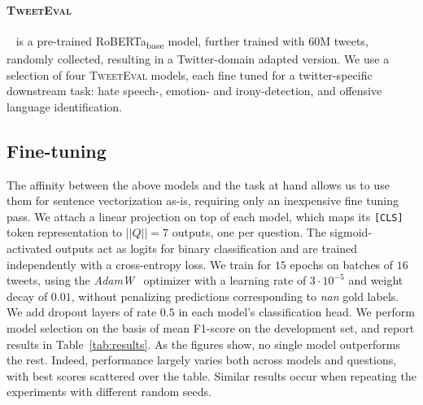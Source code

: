 \documentclass[11pt,a4paper]{article}
\begin{document}
\paragraph{\textsc{TweetEval}}~\cite{cardiff} is a pre-trained RoBERTa\textsubscript{base} model, further trained with 60M tweets, randomly collected, resulting in a Twitter-domain adapted version. 
We use a selection of four \textsc{TweetEval} models, each fine tuned for a twitter-specific downstream task: hate speech-, emotion- and irony-detection, and offensive language identification.


\subsection{Fine-tuning}
The affinity between the above models and the task at hand allows us to use them for sentence vectorization as-is, requiring only an inexpensive fine tuning pass.
We attach a linear projection on top of each model, which maps its \texttt{[CLS]} token representation to $||Q|| = 7$ outputs, one per question.
The sigmoid-activated outputs act as logits for binary classification and are trained independently with a cross-entropy loss.
We train for $15$ epochs on batches of $16$ tweets, using the \textit{AdamW}~\cite{adamw} optimizer with a learning rate of $3\cdot 10^{-5}$ and weight decay of $0.01$, without penalizing predictions corresponding to \textit{nan} gold labels.
We add dropout layers of rate $0.5$ in each model's classification head.
We perform model selection on the basis of mean F1-score on the development set, and report results in Table~\ref{tab:results}.
As the figures show, no single model outperforms the rest.
Indeed, performance largely varies both across models and questions, with best scores scattered over the table. Similar results occur when repeating the experiments with different random seeds.
\end{document}
